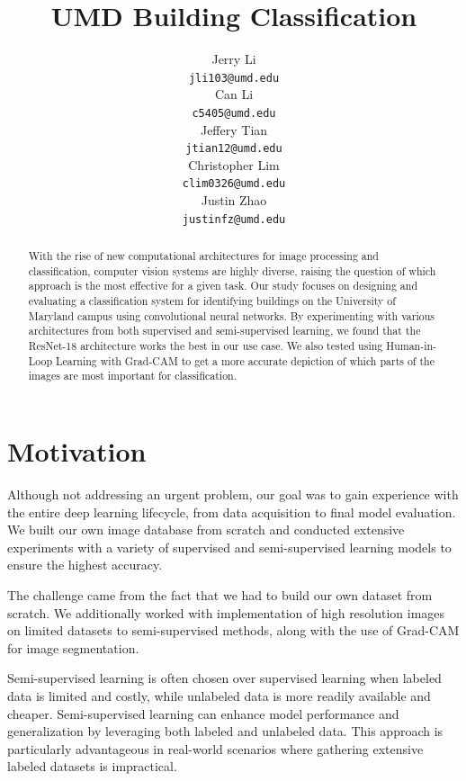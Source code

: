 \documentclass{article}
\title{ UMD Building Classification }
\author{%
  Jerry Li\\
  \texttt{jli103@umd.edu} \\
  \And 
  Can Li \\
  \texttt{c5405@umd.edu} \\
  \And 
  Jeffery Tian \\
  \texttt{jtian12@umd.edu} \\
  \And 
  Christopher Lim \\
  \texttt{clim0326@umd.edu} \\
  \And 
  Justin Zhao \\
  \texttt{justinfz@umd.edu} \\
}
\begin{document}
\maketitle



\begin{abstract}
    With the rise of new computational architectures for image processing and classification, computer vision systems are highly diverse, raising the question of which approach is the most effective for a given task. Our study focuses on designing and evaluating a classification system for identifying buildings on the University of Maryland campus using convolutional neural networks. By experimenting with various architectures from both supervised and semi-supervised learning, we found that the ResNet-18 architecture works the best in our use case. We also tested using Human-in-Loop Learning with Grad-CAM to get a more accurate depiction of which parts of the images are most important for classification.
\end{abstract}


\section{Motivation}
\label{motivation}

Although not addressing an urgent problem, our goal was to gain experience with the entire deep learning lifecycle, from data acquisition to final model evaluation. We built our own image database from scratch and conducted extensive experiments with a variety of supervised and semi-supervised learning models to ensure the highest accuracy.

The challenge came from the fact that we had to build our own dataset from scratch. We additionally worked with implementation of high resolution images on limited datasets to semi-supervised methods, along with the use of Grad-CAM for image segmentation.

Semi-supervised learning is often chosen over supervised learning when labeled data is limited and costly, while unlabeled data is more readily available and cheaper. Semi-supervised learning can enhance model performance and generalization by leveraging both labeled and unlabeled data. This approach is particularly advantageous in real-world scenarios where gathering extensive labeled datasets is impractical.
\end{document}

